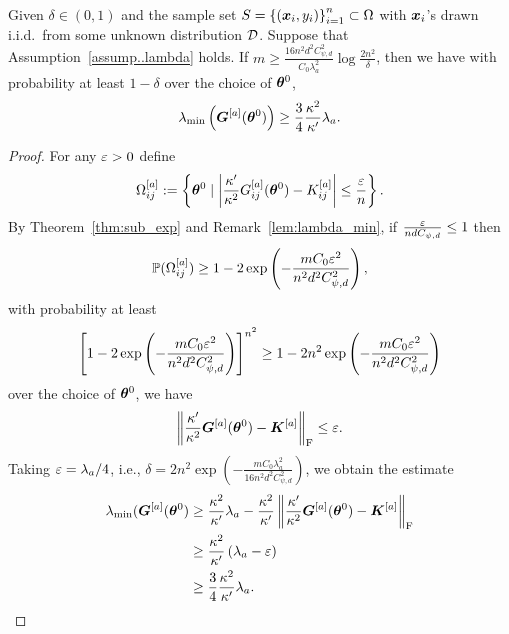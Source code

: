 \documentclass{article}
\begin{document}
\begin{lem}\label{lem:exp_a}
    Given $\delta\in(0,1)$ and the sample set $S = {\{(\bm{x}_i, y_i)\}}_{i=1}^n\subset\Omega$ with $\bm{x}_i$'s drawn i.i.d.\ from some unknown distribution $\mathcal{D}$. Suppose that Assumption~\ref{assump..lambda} holds. If $m\geq\frac{16n^2d^2C_{\psi,d}^2}{C_0\lambda_a^2}\log\frac{2n^2}{\delta}$, then we have with probability at least $1-\delta$ over the choice of $\bm{\theta}^0$,
    \begin{equation}
        \lambda_{\min}\left(\bm{G}^{[a]}(\bm{\theta}^0)\right)\geq\frac{3}{4}\frac{\kappa^2}{\kappa'}\lambda_a.
    \end{equation}
\end{lem}
\begin{proof}
    For any $\varepsilon>0$ define
    \begin{equation}
        \Omega_{ij}^{[a]}:=\left\{\bm{\theta}^0\mid\left|\frac{\kappa'}{\kappa^2}G_{ij}^{[a]}(\bm{\theta}^0)-K_{ij}^{[a]}\right|\leq\frac{\varepsilon}{n}\right\}.
    \end{equation}
    By Theorem~\ref{thm:sub_exp} and Remark~\ref{lem:lambda_min}, if $\frac{\varepsilon}{ndC_{\psi,d}}\leq 1$ then
    \begin{equation*}
        \mathbb{P}(\Omega_{ij}^{[a]}) \geq 1-2\exp\left(-\frac{mC_0\varepsilon^2}{n^2d^2C^2_{\psi,d}}\right),
    \end{equation*}
    with probability at least
    \begin{equation*}
        \left[1-2\exp\left(-\frac{mC_0\varepsilon^2}{n^2 d^2 C^2_{\psi,d}}\right)\right]^{n^2}\geq 1-2n^2\exp\left(-\frac{mC_0\varepsilon^2}{n^2 d^2 C^2_{\psi,d}}\right)
    \end{equation*}
    over the choice of $\bm{\theta}^0$, we have
    \begin{equation*}
        \left\lVert\frac{\kappa'}{\kappa^2}\bm{G}^{[a]}(\bm{\theta}^0)-\bm{K}^{[a]}\right\rVert_\mathrm{F}\leq\varepsilon.
    \end{equation*}
    Taking $\varepsilon=\lambda_a/4$, i.e., $\delta=2n^2\exp\left(-\frac{mC_0\lambda_a^2}{16n^2d^2C^2_{\psi,d}}\right)$, we obtain the estimate
    \begin{equation*}
        \begin{aligned}
            \lambda_{\min}(\bm{G}^{[a]}(\bm{\theta}^0)
             & \geq \frac{\kappa^2}{\kappa'}\lambda_a-\frac{\kappa^2}{\kappa'}\left\lVert\frac{\kappa'}{\kappa^2}\bm{G}^{[a]}(\bm{\theta}^0)-\bm{K}^{[a]}\right\rVert_\mathrm{F} \\
             & \geq \frac{\kappa^2}{\kappa'}\left(\lambda_a-\varepsilon\right)                                                                                \\
             & \geq\frac{3}{4}\frac{\kappa^2}{\kappa'}\lambda_a.
        \end{aligned}
    \end{equation*}
\end{proof}
\end{document}
